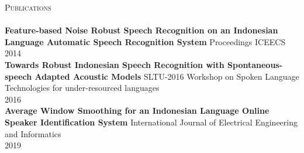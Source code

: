 \documentclass[a4paper]{article}
\newcommand{\lineunder} {
    \vspace*{-8pt} \\
    \hspace*{-18pt} \hrulefill \\
}
\newcommand{\header} [1] {
    {\hspace*{-18pt}\vspace*{6pt} \textsc{#1}}
    \vspace*{-6pt} \lineunder
}
\begin{document}
\header{Publications}
\textbf{Feature-based Noise Robust Speech Recognition on an Indonesian Language Automatic Speech Recognition System} \hfill Proceedings ICEECS\\
\hfill 2014\\
\vspace*{2mm}
\textbf{Towards Robust Indonesian Speech Recognition with Spontaneous-speech Adapted Acoustic Models} \hfill SLTU-2016 Workshop on Spoken Language Technologies for under-resourced languages\\
\hfill 2016\\
\vspace*{2mm}
\textbf{Average Window Smoothing for an Indonesian Language Online Speaker
Identification System} \hfill International Journal of Electrical Engineering
and Informatics\\
\hfill 2019\\
\vspace*{2mm}

\ 
\end{document}
